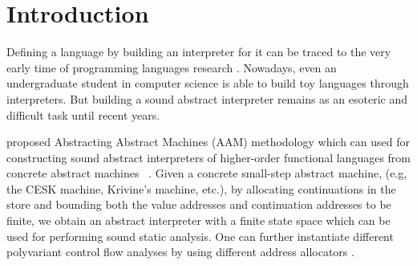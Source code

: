 \documentclass[acmsmall,review,anonymous]{acmart}\settopmatter{printfolios=true,printccs=false,printacmref=false}
\begin{document}




\maketitle

\section{Introduction}

Defining a language by building an interpreter for it can be traced to the very
early time of programming languages research \cite{landin1966next, reynolds1972definitional}.
Nowadays, even an undergraduate student in computer science is able to build toy languages
through interpreters.
But building a sound abstract interpreter remains as an esoteric and difficult task until recent years.

\citeauthor{van2012systematic} proposed Abstracting Abstract Machines (AAM) methodology which can used
for constructing sound abstract interpreters of higher-order functional languages from concrete abstract machines
~\cite{van2012systematic, van2010abstracting}.
Given a concrete small-step abstract machine, (e.g, the CESK machine, Krivine's machine, etc.),
by allocating continuations in the store and bounding both the value addresses and continuation
addresses to be finite, we obtain an abstract interpreter with a finite state space which
can be used for performing sound static analysis.
One can further instantiate different polyvariant control flow analyses by using different address allocators \cite{Gilray:2016:ACP:2951913.2951936}.
\end{document}

